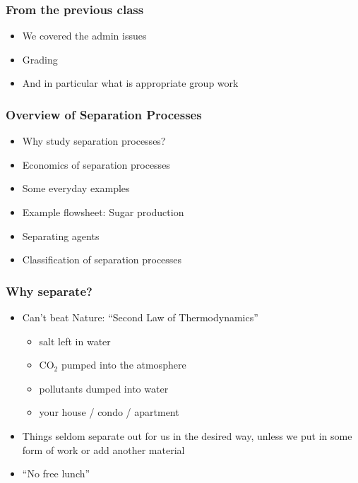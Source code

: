 

\begin{frame}\frametitle{From the previous class}
	\begin{itemize}
		\item	We covered the admin issues
		\item	Grading
		\item	And in particular what is appropriate group work
		\end{itemize}
\end{frame}

\begin{frame}\frametitle{Overview of Separation Processes}

	\begin{itemize}
		\item	Why study separation processes?
		\item	Economics of separation processes
		\item	Some everyday examples
		\item	Example flowsheet: Sugar production
		\item	Separating agents
		\item	Classification of separation processes
	\end{itemize}
\end{frame}

\begin{frame}\frametitle{Why separate?}
	\begin{itemize}
		\item	Can't beat Nature: ``Second Law of Thermodynamics''
			\begin{itemize}
				\item	salt left in water
				\item	$\text{CO}_2$ pumped into the atmosphere
				\item	pollutants dumped into water
				\item	your house / condo / apartment
			\end{itemize}
		\vspace{12pt}
		\item	Things seldom separate out for us in the desired way, unless we put in some {\color{myOrange}form of work} or {\color{myOrange}add another material}
		\item	``No free lunch''
	\end{itemize}
\end{frame}

